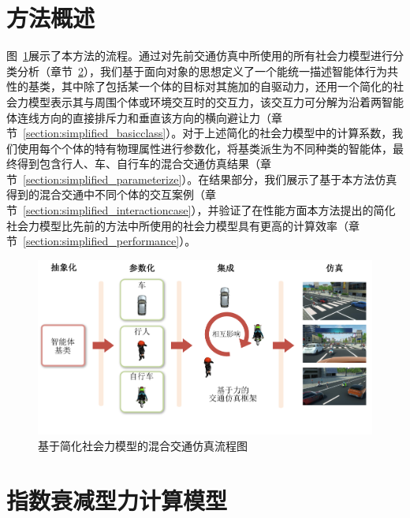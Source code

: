 \section{方法概述}


图~\ref{fig:simplified_overview}展示了本方法的流程。通过对先前交通仿真中所使用的所有社会力模型进行分类分析（章节~\ref{section:simplified_decayfunc}），我们基于面向对象的思想定义了一个能统一描述智能体行为共性的基类，其中除了包括某一个体的目标对其施加的自驱动力，还用一个简化的社会力模型表示其与周围个体或环境交互时的交互力，该交互力可分解为沿着两智能体连线方向的直接排斥力和垂直该方向的横向避让力（章节~\ref{section:simplified_basicclass}）。对于上述简化的社会力模型中的计算系数，我们使用每个个体的特有物理属性进行参数化，将基类派生为不同种类的智能体，最终得到包含行人、车、自行车的混合交通仿真结果（章节~\ref{section:simplified_parameterize}）。在结果部分，我们展示了基于本方法仿真得到的混合交通中不同个体的交互案例（章节~\ref{section:simplified_interactioncase}），并验证了在性能方面本方法提出的简化社会力模型比先前的方法中所使用的社会力模型具有更高的计算效率（章节~\ref{section:simplified_performance}）。

\begin{figure}[!htb]
\centering
\includegraphics[width=\textwidth]{figure/simplified/simplified_overview_cn.pdf}
\caption[基于简化社会力模型的混合交通仿真流程图]{
基于简化社会力模型的混合交通仿真流程图
}
\label{fig:simplified_overview}
\end{figure}


\section{指数衰减型力计算模型}
\label{section:simplified_decayfunc}


